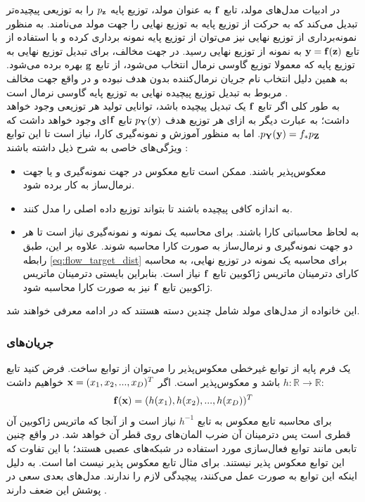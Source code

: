 در ادبیات مدل‌های مولد، تابع $\bf f$ به عنوان مولد، توزیع پایه
$p_{\bf z}$
را به توزیعی پیچیده‌تر تبدیل می‌کند که به حرکت از توزیع پایه به توزیع نهایی را جهت مولد می‌نامند. به منظور نمونه‌برداری از توزیع نهایی نیز می‌توان از توزیع پایه نمونه برداری کرده و با استفاده از تابع
${\bf y} = {\bf f} ( {\bf z} )$
به نمونه از توزیع نهایی رسید. در جهت مخالف، برای تبدیل توزیع نهایی به توزیع پایه که معمولا توزیع گاوسی نرمال انتخاب می‌شود، از تابع $\bf g$ بهره برده می‌شود. به همین دلیل انتخاب نام جریان نرمال‌کننده بدون هدف نبوده و در واقع جهت مخالف مربوط به تبدیل توزیع پیچیده نهایی به توزیع پایه گاوسی نرمال است \cite{flow_survey}.
\\
به طور کلی اگر تابع $\bf f$ یک تبدیل پیچیده باشد، توانایی تولید هر توزیعی وجود خواهد داشت؛ به عبارت دیگر به ازای هر توزیع هدف
$ p_{\bf Y}({\bf y})$
تابع $\bf f$ای وجود خواهد داشت که
$ p_{\bf Y}({\bf y}) = f_*p_{\bf Z}$.
اما به منظور آموزش و نمونه‌گیری کارا، نیاز است تا این توابع ویژگی‌های خاصی به شرح ذیل داشته باشند \cite{flow_survey}:
\begin{itemize}
	\item
	      معکوس‌پذیر باشند. ممکن است تابع معکوس در جهت نمونه‌گیری و یا جهت نرمال‌ساز به کار برده شود.
	\item
	      به اندازه کافی پیچیده باشند تا بتواند توزیع داده اصلی را مدل کنند.
	\item
	      به لحاظ محاسباتی کارا باشند. برای محاسبه \likelihood{} یک نمونه و نمونه‌گیری نیاز است تا هر دو جهت نمونه‌گیری و نرمال‌ساز به صورت کارا محاسبه شوند. علاوه بر این، طبق رابطه \ref{eq:flow_target_dist} برای محاسبه  \likelihood{} یک نمونه در توزیع نهایی، به محاسبه کارای دترمینان ماتریس ژاکوبین تابع $\bf f$ نیاز است. بنابراین بایستی دترمینان ماتریس ژاکوبین تابع $\bf f$ نیز به صورت کارا محاسبه شود.
\end{itemize}
این خانواده از مدل‌های مولد شامل چندین دسته هستند که در ادامه معرفی خواهند شد.
\subsubsection{جریان‌های
	}
یک فرم پایه از توابع غیرخطی معکوس‌پذیر را می‌توان از توابع \elementwise{} ساخت. فرض کنید تابع
$h: \mathbb{R} \rightarrow \mathbb{R}$
باشد و معکوس‌پذیر است. اگر
${\bf x} = (x_1, x_2, ..., x_D)^T$
خواهیم داشت:
\begin{gather}
	{\bf f}({\bf x}) = (h(x_1), h(x_2), ..., h(x_D))^T
\end{gather}
برای محاسبه تابع معکوس به تابع $h^{-1}$ نیاز است و از آنجا که ماتریس ژاکوبین آن قطری است پس دترمینان آن ضرب المان‌های روی قطر آن خواهد شد. در واقع چنین تابعی مانند توابع فعال‌سازی مورد استفاده در شبکه‌های عصبی هستند؛ با این تفاوت که این توابع معکوس پذیر نیستند. برای مثال تابع  معکوس پذیر نیست اما  است. به دلیل اینکه این توابع به صورت \elementwise{} عمل می‌کنند، پیچیدگی لازم را ندارند. مدل‌های بعدی سعی در پوشش این ضعف دارند \cite{flow_survey, realnvp, iaf, maf}.
